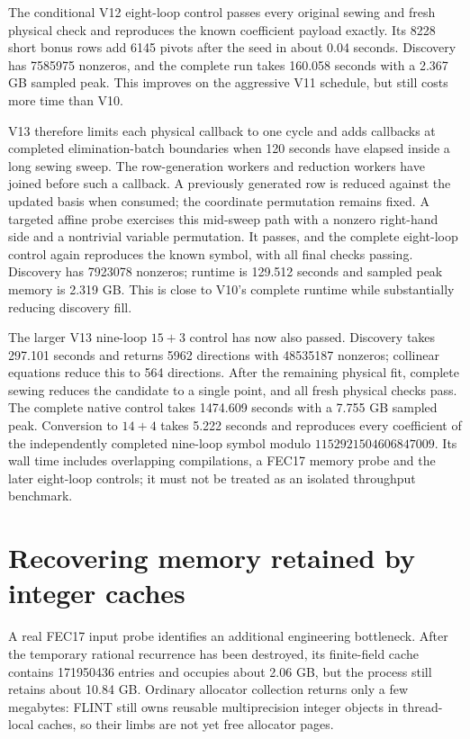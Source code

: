 \documentclass[11pt]{article}
\begin{document}
The conditional V12 eight-loop control passes every original sewing and
fresh physical check and reproduces the known coefficient payload exactly.
Its 8228 short bonus rows add 6145 pivots after the seed in about 0.04 seconds.
Discovery has 7585975 nonzeros, and the complete run takes 160.058 seconds
with a 2.367 GB sampled peak. This improves on the aggressive V11 schedule,
but still costs more time than V10.

V13 therefore limits each physical callback to one cycle and adds callbacks
at completed elimination-batch boundaries when 120 seconds have elapsed
inside a long sewing sweep. The row-generation workers and reduction workers
have joined before such a callback. A previously generated row is reduced
against the updated basis when consumed; the coordinate permutation remains
fixed. A targeted affine probe exercises this mid-sweep path with a nonzero
right-hand side and a nontrivial variable permutation. It passes, and the
complete eight-loop control again reproduces the known symbol, with all
final checks passing. Discovery has 7923078 nonzeros; runtime is 129.512
seconds and sampled peak memory is 2.319 GB. This is close to V10's complete
runtime while substantially reducing discovery fill.

The larger V13 nine-loop $15+3$ control has now also passed. Discovery takes
297.101 seconds and returns 5962 directions with 48535187 nonzeros; collinear
equations reduce this to 564 directions. After the remaining physical fit,
complete sewing reduces the candidate to a single point, and all fresh
physical checks pass. The complete native control takes 1474.609 seconds
with a 7.755 GB sampled peak. Conversion to $14+4$ takes 5.222 seconds and
reproduces every coefficient of the independently completed nine-loop
symbol modulo $1152921504606847009$. Its wall time includes overlapping
compilations, a FEC17 memory probe and the later eight-loop controls; it
must not be treated as an isolated throughput benchmark.

\section{Recovering memory retained by integer caches}
A real FEC17 input probe identifies an additional engineering bottleneck.
After the temporary rational recurrence has been destroyed, its finite-field
cache contains 171950436 entries and occupies about 2.06 GB, but the process
still retains about 10.84 GB. Ordinary allocator collection returns only a
few megabytes: FLINT still owns reusable multiprecision integer objects in
thread-local caches, so their limbs are not yet free allocator pages.
\end{document}
